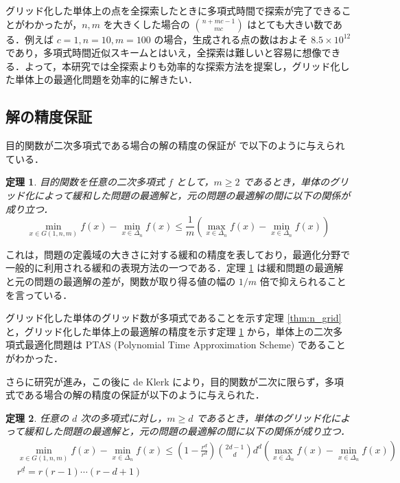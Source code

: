 \documentclass[a4paper,11pt]{jreport}
\newtheorem{theorem}{定理}
\begin{document}
グリッド化した単体上の点を全探索したときに多項式時間で探索が完了できることがわかったが，$ n, m $ を大きくした場合の $ \binom{n + mc - 1}{mc} $ はとても大きい数である．例えば $ c = 1, n = 10, m = 100 $ の場合，生成される点の数はおよそ $ 8.5 \times 10^{12} $ であり，多項式時間近似スキームとはいえ，全探索は難しいと容易に想像できる．よって，本研究では全探索よりも効率的な探索方法を提案し，グリッド化した単体上の最適化問題を効率的に解きたい．\par

\subsection{解の精度保証} \label{sec:rate_accuracy}

目的関数が二次多項式である場合の解の精度の保証が \cite{bomze} で以下のように与えられている．

\begin{theorem} \label{thm:quad_approximation}
目的関数を任意の二次多項式 $ f $ として，$ m \geq 2 $ であるとき，単体のグリッド化によって緩和した問題の最適解と，元の問題の最適解の間に以下の関係が成り立つ．
$$ \min_{x \in G(1, n, m)} f(x) - \min_{x \in \Delta_n} f(x) \leq \frac{1}{m} \left( \max_{x \in \Delta_n} f(x) - \min_{x \in \Delta_n} f(x) \right) $$
\end{theorem}

これは，問題の定義域の大きさに対する緩和の精度を表しており，最適化分野で一般的に利用される緩和の表現方法の一つである．定理 \ref{thm:quad_approximation} は緩和問題の最適解と元の問題の最適解の差が，関数が取り得る値の幅の $ 1 / m $ 倍で抑えられることを言っている．\par
グリッド化した単体のグリッド数が多項式であることを示す定理 \ref{thm:n_grid} と，グリッド化した単体上の最適解の精度を示す定理 \ref{thm:quad_approximation} から，単体上の二次多項式最適化問題は PTAS (Polynomial Time Approximation Scheme) であることがわかった．\par
さらに研究が進み，この後に de Klerk \cite{deklerk_poly} により，目的関数が二次に限らず，多項式である場合の解の精度の保証が以下のように与えられた．\par

\begin{theorem} \label{thm:poly_approximation}
任意の $ d $ 次の多項式に対し，$ m \geq d $ であるとき，単体のグリッド化によって緩和した問題の最適解と，元の問題の最適解の間に以下の関係が成り立つ．
\begin{align*}
& \min_{x \in G(1, n, m)} f(x) - \min_{x \in \Delta_n} f(x) \leq \left( 1 - \frac{r^{\underline{d}}}{r^d} \right) \binom{2d - 1}{d} d^d \left( \max_{x \in \Delta_n} f(x) - \min_{x \in \Delta_n} f(x) \right) \\
& r^{\underline{d}} = r (r - 1) \cdots (r - d + 1)
\end{align*}
\end{theorem}
\end{document}
